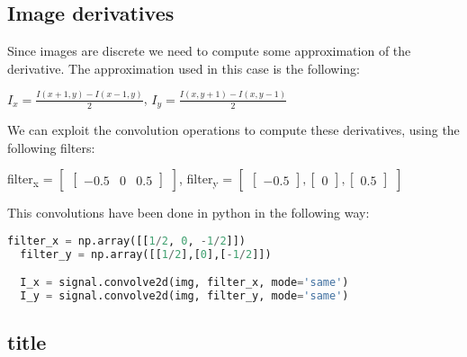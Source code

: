 \documentclass{ETHExercise}
\begin{document}
\subsection{Image derivatives}

Since images are discrete we need to compute some approximation of the derivative.
The approximation used in this case is the following:
\begin{center}
  $I_x = \frac{I(x+1, y)- I(x-1, y)}{2}$, $I_y = \frac{I(x, y+1)- I(x, y-1)}{2}$
\end{center}
We can exploit the convolution operations to compute these derivatives, 
using the following filters:
\begin{center}
  filter\textsubscript{x} = $\begin{bmatrix}
    \begin{bmatrix}
      -0.5 & 0 & 0.5
    \end{bmatrix}
  \end{bmatrix}
  $, filter\textsubscript{y} = $\begin{bmatrix}
    \begin{bmatrix}
      -0.5 
    \end{bmatrix},
    \begin{bmatrix}
     0 
    \end{bmatrix},
    \begin{bmatrix}
    0.5
    \end{bmatrix}
  \end{bmatrix}
  $
\end{center}
This convolutions have been done in python in the following way:
\begin{lstlisting}[language=Python, caption=Image gradients]
  filter_x = np.array([[1/2, 0, -1/2]])
  filter_y = np.array([[1/2],[0],[-1/2]])

  I_x = signal.convolve2d(img, filter_x, mode='same')
  I_y = signal.convolve2d(img, filter_y, mode='same')
\end{lstlisting}

\subsection{title}
\end{document}
